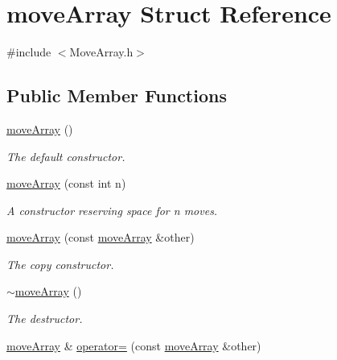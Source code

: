 \hypertarget{structmoveArray}{}\section{move\+Array Struct Reference}
\label{structmoveArray}


{\ttfamily \#include $<$Move\+Array.\+h$>$}

\subsection*{Public Member Functions}
\begin{DoxyCompactItemize}
\item 
\hyperlink{structmoveArray_adad62027e18e94b8034a5162a161e979}{move\+Array} ()\hypertarget{structmoveArray_adad62027e18e94b8034a5162a161e979}{}\label{structmoveArray_adad62027e18e94b8034a5162a161e979}

\begin{DoxyCompactList}\small\item\em The default constructor. \end{DoxyCompactList}\item 
\hyperlink{structmoveArray_a3cb7e6bc3daac07f3005e7ca18af4589}{move\+Array} (const int n)\hypertarget{structmoveArray_a3cb7e6bc3daac07f3005e7ca18af4589}{}\label{structmoveArray_a3cb7e6bc3daac07f3005e7ca18af4589}

\begin{DoxyCompactList}\small\item\em A constructor reserving space for {\itshape n} moves. \end{DoxyCompactList}\item 
\hyperlink{structmoveArray_a78117ae0946c2a61ff86a832c420c854}{move\+Array} (const \hyperlink{structmoveArray}{move\+Array} \&other)\hypertarget{structmoveArray_a78117ae0946c2a61ff86a832c420c854}{}\label{structmoveArray_a78117ae0946c2a61ff86a832c420c854}

\begin{DoxyCompactList}\small\item\em The copy constructor. \end{DoxyCompactList}\item 
\hyperlink{structmoveArray_ac0a694dea63dc46f9c524766aa457d4f}{$\sim$move\+Array} ()\hypertarget{structmoveArray_ac0a694dea63dc46f9c524766aa457d4f}{}\label{structmoveArray_ac0a694dea63dc46f9c524766aa457d4f}

\begin{DoxyCompactList}\small\item\em The destructor. \end{DoxyCompactList}\item 
\hyperlink{structmoveArray}{move\+Array} \& \hyperlink{structmoveArray_ad7c5f1a65aab09aebbd565bb9cb4e75a}{operator=} (const \hyperlink{structmoveArray}{move\+Array} \&other)\hypertarget{structmoveArray_ad7c5f1a65aab09aebbd565bb9cb4e75a}{}\label{structmoveArray_ad7c5f1a65aab09aebbd565bb9cb4e75a}


\end{DoxyCompactItemize}
